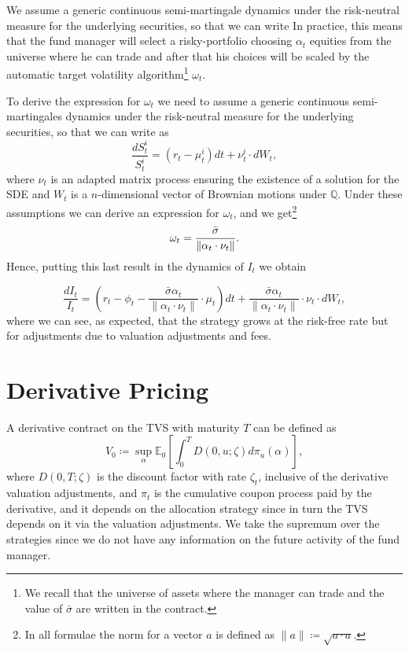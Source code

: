 \documentclass[11pt]{article}
\begin{document}
We assume a generic continuous semi-martingale dynamics under the risk-neutral measure for the underlying securities, so that we can write
In practice, this means that the fund manager will select a risky-portfolio choosing $\alpha_t$ equities from the universe where he can trade and after that his choices will be scaled by the automatic target volatility algorithm\footnote{We recall that the universe of assets where the manager can trade and the value of $\bar{\sigma}$ are written in the contract.} $\omega_t$.

To derive the expression for $\omega_t$ we need to assume a generic continuous semi-martingales dynamics under the risk-neutral measure for the underlying securities, so that we can write  as 
\begin{equation}
    \frac{dS_t^i}{S_t^i} = \left(r_t - \mu_t^i \right)dt + \nu_t^i \cdot dW_t,
\label{Equity_process}\end{equation}
where $\nu_t$ is an adapted matrix process ensuring the existence of a solution for the SDE and $W_t$ is a $n$-dimensional vector of Brownian motions under $\mathbb{Q}$. Under these assumptions we can derive an expression for $\omega_t$, and we get\footnote{In all formulae the norm for a vector $a$ is defined as $\|a\|\coloneqq\sqrt{a\cdot a}$.}
\begin{equation}
    \omega_t = \frac{\Bar{\sigma}}{\|\alpha_t\cdot \nu_t \|}.
\end{equation}
Hence, putting this last result in the dynamics of $I_t$ we obtain

\begin{equation}
     \frac{dI_t}{I_t} = \left(r_t -  \phi_t     - \frac{\bar{\sigma} \alpha_t}{\|\alpha_t \cdot \nu_t \|}  \cdot \mu_t \right)dt+ \frac{\bar{\sigma}\alpha_t }{\|\alpha_t \cdot \nu_t \|} \cdot \nu_t \cdot dW_t,
\label{eq:TVS_last}\end{equation}
where we can see, as expected, that the strategy grows at the risk-free rate but for adjustments due to valuation adjustments and fees.
\section{Derivative Pricing}\label{sec:Derivative}
A derivative contract on the TVS with maturity $T$ can be defined as
\begin{equation}
    V_0 \coloneqq \sup_\alpha \mathbb{E}_0\left[\int_0^T D(0,u;\zeta)d\pi_u(\alpha)\right],
\end{equation}
where $D(0,T;\zeta)$ is the discount factor with rate $\zeta_t$, inclusive of the derivative valuation adjustments, and $\pi_t$ is the cumulative coupon process paid by the derivative, and it depends on the allocation strategy since in turn the TVS depends on it via the valuation adjustments. We take the supremum over the strategies since we do not have any information on the future activity of the fund manager.
\end{document}
